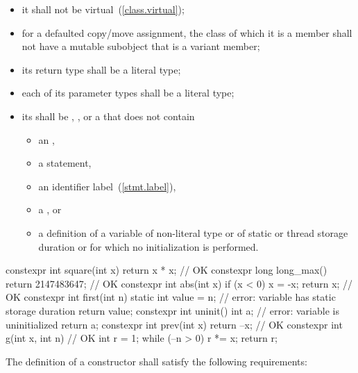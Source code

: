 \begin{itemize}
\item
it shall not be virtual~(\ref{class.virtual});

\item
for a defaulted copy/move assignment, the class of which it is a member
shall not have a mutable subobject that is a variant member;

\item
its return type shall be a literal type;

\item
each of its parameter types shall be a literal type;

\item
its  shall be
, , or
a 
that does not contain

\begin{itemize}
\item an ,
\item a  statement,
\item an identifier label~(\ref{stmt.label}),
\item a , or
\item a definition of a variable
of non-literal type or
of static or thread storage duration or
for which no initialization is performed.
\end{itemize}

\end{itemize}

\enterexample
\begin{codeblock}
constexpr int square(int x) 
  { return x * x; }             // OK
constexpr long long_max() 
  { return 2147483647; }        // OK
constexpr int abs(int x) {
  if (x < 0)
    x = -x;
  return x;                     // OK
}
constexpr int first(int n) {
  static int value = n;         // error: variable has static storage duration
  return value;
}
constexpr int uninit() {
  int a;                        // error: variable is uninitialized
  return a;
}
constexpr int prev(int x)
  { return --x; }               // OK
constexpr int g(int x, int n) { // OK
  int r = 1;
  while (--n > 0) r *= x;
  return r;
}
\end{codeblock}
\exitexample

\pnum
{}%
The definition of a  constructor shall satisfy the
following requirements:

